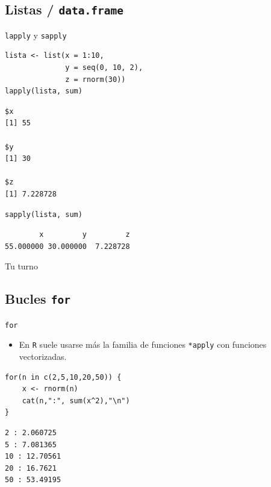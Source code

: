 \documentclass[xcolor={usenames,svgnames,dvipsnames}]{beamer}
\begin{document}
\subsection{Listas / \texttt{data.frame}}
\label{sec-4-2}
\begin{frame}[fragile,label=sec-4-2-1]{\texttt{lapply} y \texttt{sapply}}
 \lstset{language=R,label= ,caption= ,numbers=none}
\begin{lstlisting}
lista <- list(x = 1:10,
              y = seq(0, 10, 2),
              z = rnorm(30))
lapply(lista, sum)
\end{lstlisting}

\begin{verbatim}
$x
[1] 55

$y
[1] 30

$z
[1] 7.228728
\end{verbatim}

\lstset{language=R,label= ,caption= ,numbers=none}
\begin{lstlisting}
sapply(lista, sum)
\end{lstlisting}

\begin{verbatim}
        x         y         z 
55.000000 30.000000  7.228728
\end{verbatim}
\end{frame}

\begin{frame}[label=sec-4-2-2]{Tu turno}
\end{frame}
\subsection{Bucles \texttt{for}}
\label{sec-4-3}
\begin{frame}[fragile,label=sec-4-3-1]{\texttt{for}}
 \begin{itemize}
\item En \texttt{R} suele usarse más la familia de funciones \texttt{*apply} con funciones vectorizadas.
\end{itemize}
\lstset{language=R,label= ,caption= ,numbers=none}
\begin{lstlisting}
for(n in c(2,5,10,20,50)) {
    x <- rnorm(n)
    cat(n,":", sum(x^2),"\n")
}
\end{lstlisting}

\begin{verbatim}
2 : 2.060725 
5 : 7.081365 
10 : 12.70561 
20 : 16.7621 
50 : 53.49195
\end{verbatim}
\end{frame}
\end{document}
